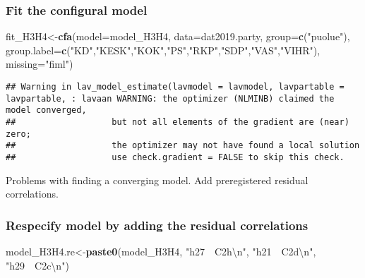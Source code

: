 \documentclass[
]{article}
\newenvironment{Shaded}{\begin{snugshade}}{\end{snugshade}}
\newcommand{\CharTok}[1]{\textcolor[rgb]{0.31,0.60,0.02}{#1}}
\newcommand{\DataTypeTok}[1]{\textcolor[rgb]{0.13,0.29,0.53}{#1}}
\newcommand{\KeywordTok}[1]{\textcolor[rgb]{0.13,0.29,0.53}{\textbf{#1}}}
\newcommand{\NormalTok}[1]{#1}
\newcommand{\StringTok}[1]{\textcolor[rgb]{0.31,0.60,0.02}{#1}}
\begin{document}
\hypertarget{fit-the-configural-model}{%
\subsubsection{Fit the configural
model}\label{fit-the-configural-model}}

\begin{Shaded}
\begin{Highlighting}[]
\NormalTok{fit_H3H4<-}\KeywordTok{cfa}\NormalTok{(}\DataTypeTok{model=}\NormalTok{model_H3H4,}
              \DataTypeTok{data=}\NormalTok{dat2019.party,}
              \DataTypeTok{group=}\KeywordTok{c}\NormalTok{(}\StringTok{"puolue"}\NormalTok{),}
              \DataTypeTok{group.label=}\KeywordTok{c}\NormalTok{(}\StringTok{"KD"}\NormalTok{,}\StringTok{"KESK"}\NormalTok{,}\StringTok{"KOK"}\NormalTok{,}\StringTok{"PS"}\NormalTok{,}\StringTok{"RKP"}\NormalTok{,}\StringTok{"SDP"}\NormalTok{,}\StringTok{"VAS"}\NormalTok{,}\StringTok{"VIHR"}\NormalTok{),}
              \DataTypeTok{missing=}\StringTok{"fiml"}\NormalTok{)}
\end{Highlighting}
\end{Shaded}

\begin{verbatim}
## Warning in lav_model_estimate(lavmodel = lavmodel, lavpartable = lavpartable, : lavaan WARNING: the optimizer (NLMINB) claimed the model converged,
##                   but not all elements of the gradient are (near) zero;
##                   the optimizer may not have found a local solution
##                   use check.gradient = FALSE to skip this check.
\end{verbatim}

Problems with finding a converging model. Add preregistered residual
correlations.

\hypertarget{respecify-model-by-adding-the-residual-correlations}{%
\subsubsection{Respecify model by adding the residual
correlations}\label{respecify-model-by-adding-the-residual-correlations}}

\begin{Shaded}
\begin{Highlighting}[]
\NormalTok{model_H3H4.re<-}\KeywordTok{paste0}\NormalTok{(model_H3H4,}
                      \StringTok{"h27~~C2h}\CharTok{\textbackslash{}n}\StringTok{"}\NormalTok{,}
                      \StringTok{"h21~~C2d}\CharTok{\textbackslash{}n}\StringTok{"}\NormalTok{,}
                      \StringTok{"h29~~C2c}\CharTok{\textbackslash{}n}\StringTok{"}\NormalTok{)}
\end{Highlighting}
\end{Shaded}
\end{document}
